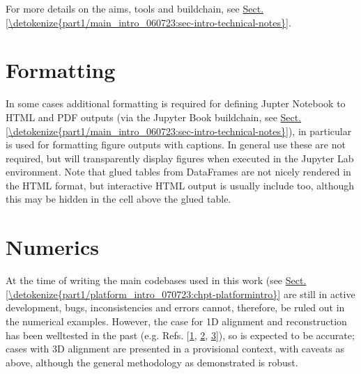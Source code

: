 \documentclass[letterpaper,table,10pt,english]{jupyterBook}
\begin{document}
\sphinxAtStartPar
For more details on the aims, tools and build\sphinxhyphen{}chain, see \hyperref[\detokenize{part1/main_intro_060723:sec-intro-technical-notes}]{Sect.\@ \ref{\detokenize{part1/main_intro_060723:sec-intro-technical-notes}}}.


\section{Formatting}
\label{\detokenize{frontmatter/book_versions_note:formatting}}
\sphinxAtStartPar
In some cases additional formatting is required for defining Jupter Notebook to HTML and PDF outputs (via the Jupyter Book build\sphinxhyphen{}chain, see \hyperref[\detokenize{part1/main_intro_060723:sec-intro-technical-notes}]{Sect.\@ \ref{\detokenize{part1/main_intro_060723:sec-intro-technical-notes}}}), in particular  is used for formatting figure outputs with captions. In general use these are not required, but will transparently display figures when executed in the Jupyter Lab environment. Note that glued tables from  DataFrames are not nicely rendered in the HTML format, but interactive HTML output is usually include too, although this may be hidden in the cell above the glued table.


\section{Numerics}
\label{\detokenize{frontmatter/book_versions_note:numerics}}\label{\detokenize{frontmatter/book_versions_note:sec-numerics-disclaimer}}
\sphinxAtStartPar
At the time of writing the main code\sphinxhyphen{}bases used in this work (see \hyperref[\detokenize{part1/platform_intro_070723:chpt-platformintro}]{Sect.\@ \ref{\detokenize{part1/platform_intro_070723:chpt-platformintro}}} are still in active development, bugs, inconsistencies and errors cannot, therefore, be ruled out in the numerical examples. However, the case for 1D alignment and reconstruction has been well\sphinxhyphen{}tested in the past (e.g. Refs. {[}\hyperlink{cite.backmatter/bibliography:id775}{1}, \hyperlink{cite.backmatter/bibliography:id684}{2}, \hyperlink{cite.backmatter/bibliography:id685}{3}{]}), so is expected to be accurate; cases with 3D alignment are presented in a provisional context, with caveats as above, although the general methodology as demonstrated is robust.
\end{document}
